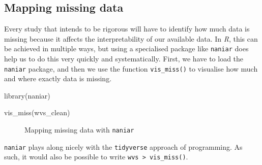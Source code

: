 \documentclass[
  letterpaper,
]{krantz}
\makeatletter
\newenvironment{Shaded}{\begin{snugshade}}{\end{snugshade}}
\newcommand{\FunctionTok}[1]{\textcolor[rgb]{0.28,0.35,0.67}{#1}}
\newcommand{\NormalTok}[1]{\textcolor[rgb]{0.00,0.23,0.31}{#1}}
\newenvironment{kframe}{%
\medskip{}
\setlength{\fboxsep}{.8em}
 \def\at@end@of@kframe{}%
 \ifinner\ifhmode%
  \def\at@end@of@kframe{\end{minipage}}%
  \begin{minipage}{\columnwidth}%
 \fi\fi%
 \def\FrameCommand##1{\hskip\@totalleftmargin \hskip-\fboxsep
 \colorbox{shadecolor}{##1}\hskip-\fboxsep
     \hskip-\linewidth \hskip-\@totalleftmargin \hskip\columnwidth}%
 \MakeFramed {\advance\hsize-\width
   \@totalleftmargin\z@ \linewidth\hsize
   \@setminipage}}%
 {\par\unskip\endMakeFramed%
 \at@end@of@kframe}
\renewenvironment{Shaded}{\begin{kframe}}{\end{kframe}}
\makeatother
\begin{document}
\subsection{Mapping missing data}\label{sec-mapping-missing-data}

Every study that intends to be rigorous will have to identify how much
data is missing because it affects the interpretability of our available
data. In \emph{R}, this can be achieved in multiple ways, but using a
specialised package like \texttt{naniar} does help us to do this very
quickly and systematically. First, we have to load the \texttt{naniar}
package, and then we use the function \texttt{vis\_miss()} to visualise
how much and where exactly data is missing.

\begin{Shaded}
\begin{Highlighting}[]
\FunctionTok{library}\NormalTok{(naniar)}

\FunctionTok{vis\_miss}\NormalTok{(wvs\_clean)}
\end{Highlighting}
\end{Shaded}

\begin{figure}[H]


\caption{\label{fig-mapping-missing-data}Mapping missing data with
\texttt{naniar}}

\end{figure}%

\texttt{naniar} plays along nicely with the \texttt{tidyverse} approach
of programming. As such, it would also be possible to write
\texttt{wvs\ \textbar{}\textgreater{}\ vis\_miss()}.
\end{document}
